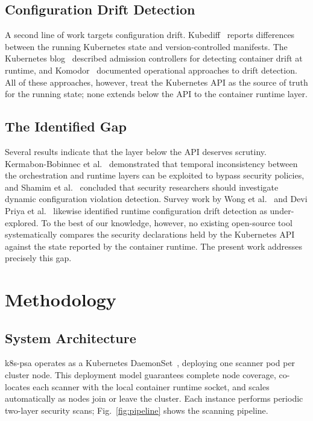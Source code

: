 \documentclass[conference]{IEEEtran}
\begin{document}
\subsection{Configuration Drift Detection}

A second line of work targets configuration drift. Kubediff~\cite{kubediff2020} reports differences between the running Kubernetes state and version-controlled manifests. The Kubernetes blog~\cite{k8sdrift2021} described admission controllers for detecting container drift at runtime, and Komodor~\cite{komodor2023} documented operational approaches to drift detection. All of these approaches, however, treat the Kubernetes API as the source of truth for the running state; none extends below the API to the container runtime layer.

\subsection{The Identified Gap}

Several results indicate that the layer below the API deserves scrutiny. Kermabon-Bobinnec et al.~\cite{prospec2022} demonstrated that temporal inconsistency between the orchestration and runtime layers can be exploited to bypass security policies, and Shamim et al.~\cite{shamim2025} concluded that security researchers should investigate dynamic configuration violation detection. Survey work by Wong et al.~\cite{wong2023} and Devi Priya et al.~\cite{devipriya2023} likewise identified runtime configuration drift detection as under-explored. To the best of our knowledge, however, no existing open-source tool systematically compares the security declarations held by the Kubernetes API against the state reported by the container runtime. The present work addresses precisely this gap.

\section{Methodology}

\subsection{System Architecture}

k8s-psa operates as a Kubernetes DaemonSet~\cite{k8sdaemonset2024}, deploying one scanner pod per cluster node. This deployment model guarantees complete node coverage, co-locates each scanner with the local container runtime socket, and scales automatically as nodes join or leave the cluster. Each instance performs periodic two-layer security scans; Fig.~\ref{fig:pipeline} shows the scanning pipeline.
\end{document}
